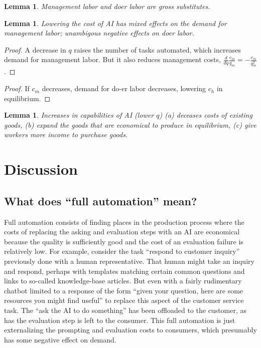 \documentclass{article}
\newtheorem{lemma}[theorem]{Lemma}
\begin{document}
\begin{lemma}
  Management labor and doer labor are gross substitutes.
\end{lemma}

\begin{lemma}
  Lowering the cost of AI has mixed effects on the demand for management labor; unambigous negative effects on doer labor.
\end{lemma}
\begin{proof}
  A decrease in $q$ raises the number of tasks automated, which increases demand for management labor.
  But it also reduces management costs, $\frac{d}{d q} \frac{c_m}{q_m} = -\frac{c_m}{q_m^2}$.
\end{proof}

\begin{proof}
  If $c_m$ decreases, demand for do-er labor decreases, lowering $c_h$ in equilibrium.
\end{proof}

\begin{lemma}
Increases in capabilities of AI (lower $q$) (a) deceases costs of existing goods, (b) expand the goods that are economical to produce in equilibrium, (c) give workers more income to purchase goods.  
\end{lemma}

\section{Discussion}

\subsection{What does ``full automation'' mean?}
Full automation consists of finding places in the production process where the costs of replacing the asking and evaluation steps with an AI are economical because the quality is sufficiently good and the cost of an evaluation failure is relatively low. 
For example, consider the task ``respond to customer inquiry'' previously done with a human representative. 
That human might take an inquiry and respond, perhaps with templates matching certain common questions and links to so-called knowledge-base articles. 
But even with a fairly rudimentary chatbot limited to a response of the form ``given your question, here are some resources you might find useful'' to replace this aspect of the customer service task.
The ``ask the AI to do something'' has been offloaded to the customer, as has the evaluation step is left to the consumer.
This full automation is just externalizing the prompting and evaluation costs to consumers, which presumably has some negative effect on demand.  
\end{document}
